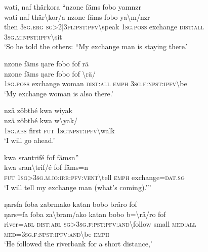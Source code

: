 \ea\label{ex:5:a1486}
wati, naf thärkora ``nzone fäms fobo yamnzr\\
\gll wati	naf	thär{\textbackslash}kor/a	nzone	fäms	fobo	ya{\textbackslash}m/nzr\\
     then	3\textsc{sg}.\textsc{erg}	\textsc{sg}>2|3\textsc{pl}:\textsc{pst}:\textsc{pfv}{\textbackslash}speak	1\textsc{sg}.\textsc{poss}	exchange	\textsc{dist}:\textsc{all}	3\textsc{sg}.\textsc{m}:\textsc{npst}:\textsc{ipfv}{\textbackslash}sit\\
\glt `So he told the others: ``My exchange man is staying there.'
\z

\ea\label{ex:5:a1487}
nzone fäms ŋare fobo fof rä\\
\gll nzone	fäms	ŋare	fobo	fof	{\textbackslash}rä/\\
     1\textsc{sg}.\textsc{poss}	exchange	woman	\textsc{dist}:\textsc{all}	\textsc{emph}	3\textsc{sg}.\textsc{f}:\textsc{npst}:\textsc{ipfv}{\textbackslash}be\\
\glt `My exchange woman is also there.'
\z

\ea\label{ex:5:a1488}
nzä zöbthé kwa wiyak\\
\gll nzä	zöbthé	kwa	w{\textbackslash}yak/\\
     1\textsc{sg}.\textsc{abs}	first	\textsc{fut}	1\textsc{sg}:\textsc{npst}:\textsc{ipfv}{\textbackslash}walk\\
\glt `I will go ahead.'
\z

\ea\label{ex:5:a1489}
kwa srantrifé fof fämsn''\\
\gll kwa	sran{\textbackslash}trif/é	fof	fäms=n\\
     \textsc{fut}	1\textsc{sg}>3\textsc{sg}.\textsc{m}.\textsc{io}:\textsc{irr}:\textsc{pfv}:\textsc{vent}{\textbackslash}tell	\textsc{emph}	exchange=\textsc{dat}.\textsc{sg}\\
\glt `I will tell my exchange man (what's coming).'''
\z

\ea\label{ex:5:a1491}
ŋarsfa foba zabrmako katan bobo bräro fof\\
\gll ŋars=fa	foba	za{\textbackslash}bram/ako	katan	bobo	b={\textbackslash}rä/ro	fof\\
     river=\textsc{abl}	\textsc{dist}:\textsc{abl}	\textsc{sg}>3\textsc{sg}.\textsc{f}:\textsc{pst}:\textsc{pfv}:\textsc{and}{\textbackslash}follow	small	\textsc{med}:\textsc{all}	\textsc{med}=3\textsc{sg}.\textsc{f}:\textsc{npst}:\textsc{ipfv}:\textsc{and}{\textbackslash}be	\textsc{emph}\\
\glt `He followed the riverbank for a short distance,'
\z


